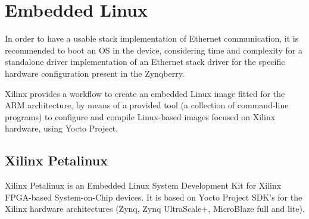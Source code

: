%  
%  
%  
%  
%  
%  

\chapter{Embedded Linux} \label{embedded-linux}

In order to have a usable stack implementation of Ethernet communication, it is recommended to boot
an OS in the device, considering time and complexity for a standalone driver implementation of an
Ethernet stack driver for the specific hardware configuration present in the Zynqberry.

Xilinx provides a workflow to create an embedded Linux image fitted for the ARM architecture, by
means of a provided tool (a collection of command-line programs) to configure and compile
Linux-based images focused on Xilinx hardware, using Yocto Project.

\section{Xilinx Petalinux}

Xilinx Petalinux is an Embedded Linux System Development Kit for Xilinx FPGA-based System-on-Chip
devices\cite{UG1144}. It is based on Yocto Project SDK's for the Xilinx hardware architectures
(Zynq, Zynq UltraScale+, MicroBlaze full and lite).

